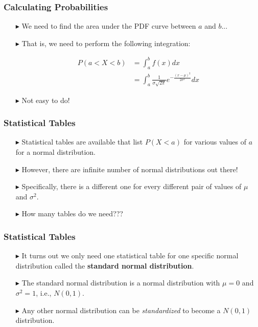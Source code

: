\documentclass[12pt]{beamer}
\begin{document}
\begin{frame}
	\frametitle{Calculating Probabilities}
	
	\begin{itemize}
		\item[\color{blue}$\blacktriangleright$] We need to find the area under the PDF curve 
		between $a$ and $b$...
		
		\item[\color{blue}$\blacktriangleright$] That is, we need to perform the following 
		integration:
		
		\vspace{0.5em}
		\begin{align*}
			P(a < X < b) &= \int_a^b f(x)dx \\[1em]
			&= \int_a^b \frac{1}{\sigma\sqrt{2\pi}} e^{-\frac{(x-\mu)^2}{2\sigma^2}} dx
		\end{align*}
		\vspace{0.5em}
		
		\item[\color{blue}$\blacktriangleright$] Not easy to do!
	\end{itemize}
	
\end{frame}
\begin{frame}
	\frametitle{Statistical Tables}
	
	\begin{itemize}
		\item[\color{blue}$\blacktriangleright$] Statistical tables are available that list $P(X < a)$ for various values of $a$ for a normal distribution.
		 
		\item[\color{blue}$\blacktriangleright$] However, there are infinite number of normal distributions out there!
		
		\item[\color{blue}$\blacktriangleright$] Specifically, there is a different one for every different pair of values of $\mu$ and $\sigma^2$.
		\item[\color{blue}$\blacktriangleright$] How many tables do we need???
	\end{itemize}
	
\end{frame}

\begin{frame}
	\frametitle{Statistical Tables}
	
	\begin{itemize}
		\item[\color{blue}$\blacktriangleright$] It turns out we only need one statistical table for one specific normal distribution called the {\bf standard normal distribution}.
		
		\item[\color{blue}$\blacktriangleright$] The standard normal distribution is a normal distribution with $\mu=0$ and $\sigma^2=1$, i.e., $N(0,1)$.
		
		\item[\color{blue}$\blacktriangleright$] Any other normal distribution can be {\sl standardized} to become a $N(0,1)$ distribution.
	\end{itemize}
	
\end{frame}
\end{document}

